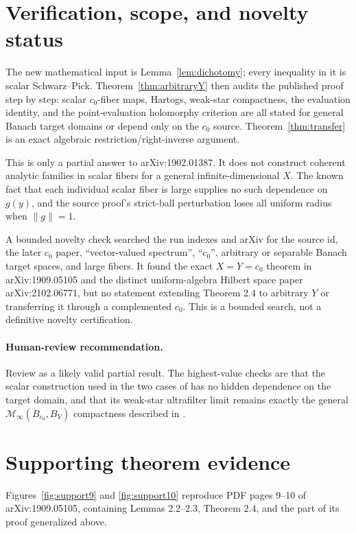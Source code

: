\documentclass[11pt]{article}
\newcommand{\Minf}{\mathcal M_\infty}
\begin{document}
\section{Verification, scope, and novelty status}

The new mathematical input is Lemma~\ref{lem:dichotomy}; every inequality in
it is scalar Schwarz--Pick.  Theorem~\ref{thm:arbitraryY} then audits the
published proof step by step: scalar $c_0$-fiber maps, Hartogs, weak-star
compactness, the evaluation identity, and the point-evaluation holomorphy
criterion are all stated for general Banach target domains or depend only on
the $c_0$ source.  Theorem~\ref{thm:transfer} is an exact algebraic
restriction/right-inverse argument.

This is only a partial answer to arXiv:1902.01387.  It does not construct
coherent analytic families in scalar fibers for a general infinite-dimensional
$X$.  The known fact that each individual scalar fiber is large supplies no
such dependence on $g(y)$, and the source proof's strict-ball perturbation loses
all uniform radius when $\|g\|=1$.

A bounded novelty check searched the run indexes and arXiv for the source id,
the later $c_0$ paper, ``vector-valued spectrum'', ``$c_0$'', arbitrary or
separable Banach target spaces, and large fibers.  It found the exact
$X=Y=c_0$ theorem in arXiv:1909.05105 and the distinct uniform-algebra Hilbert
space paper arXiv:2102.06771, but no statement extending Theorem 2.4 to
arbitrary $Y$ or transferring it through a complemented $c_0$.  This is a
bounded search, not a definitive novelty certification.

\paragraph{Human-review recommendation.}
Review as a likely valid partial result.  The highest-value checks are that
the scalar construction used in the two cases of
\cite[Theorem 2.4]{DimantSingerPolydisk} has no hidden dependence on the target
domain, and that its weak-star ultrafilter limit remains exactly the general
$\Minf(B_{c_0},B_Y)$ compactness described in
\cite{DimantSingerFibered}.

\clearpage
\section*{Supporting theorem evidence}
Figures~\ref{fig:support9} and \ref{fig:support10} reproduce PDF pages 9--10
of arXiv:1909.05105, containing Lemmas 2.2--2.3, Theorem 2.4, and the part of
its proof generalized above.
\end{document}
